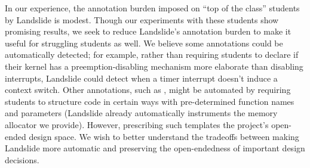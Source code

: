 In our experience,
the annotation burden imposed on ``top of the class'' students by Landslide is modest.
Though our experiments with these students show promising results, we seek to reduce Landslide's annotation burden to make it useful for struggling students as well.
%
We believe some annotations could be automatically detected;
for example, rather than requiring students to declare if their kernel has a preemption-disabling mechanism more elaborate than disabling interrupts, Landslide could detect when a timer interrupt doesn't induce a context switch.
Other annotations, such as ,
might be automated by requiring students to structure code in
certain ways with pre-determined function names and parameters
(Landslide already automatically instruments the memory allocator we provide).
However, prescribing such templates
the project's open-ended design space.
We wish to better understand the tradeoffs between
making Landslide more automatic and preserving the open-endedness of important design decisions.




